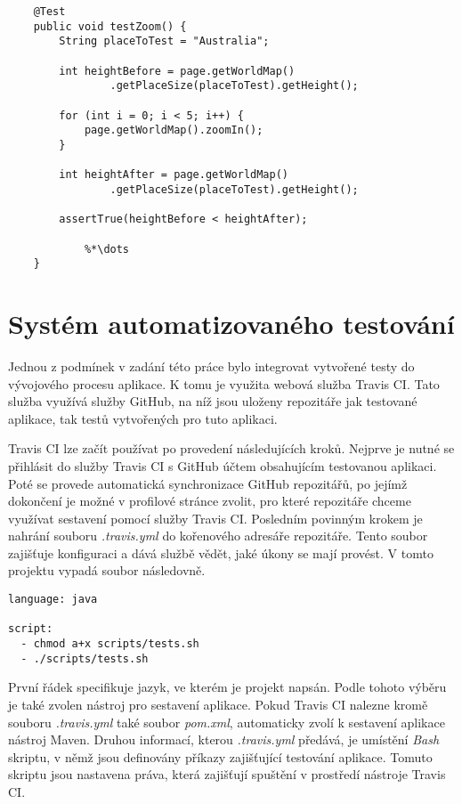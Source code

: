 \documentclass[
    color,   %
	table,   %
    twoside, %
    nolot, nolof
]{fithesis3}
\begin{document}
\begin{lstlisting}
	@Test
	public void testZoom() {
		String placeToTest = "Australia";
		
		int heightBefore = page.getWorldMap()
				.getPlaceSize(placeToTest).getHeight();
				
		for (int i = 0; i < 5; i++) {
			page.getWorldMap().zoomIn();
		}
		
		int heightAfter = page.getWorldMap()
				.getPlaceSize(placeToTest).getHeight();
				
		assertTrue(heightBefore < heightAfter);
		
		 	%*\dots
	}
\end{lstlisting} 

\chapter{Systém automatizovaného testování}
\label{ch:chapter6}
Jednou z podmínek v zadání této práce bylo integrovat vytvořené testy do vývojového procesu aplikace. K tomu je využita webová služba Travis CI. Tato služba využívá služby GitHub, na níž jsou uloženy repozitáře jak testované aplikace, tak testů vytvořených pro tuto aplikaci. 

Travis CI lze začít používat po provedení následujících kroků. Nejprve je nutné se přihlásit do služby Travis CI s GitHub účtem obsahujícím testovanou aplikaci. Poté se provede automatická synchronizace GitHub repozitářů, po jejímž dokončení je možné v profilové stránce zvolit, pro které repozitáře chceme využívat sestavení pomocí služby Travis CI. Posledním povinným krokem je nahrání souboru \emph{.travis.yml} do kořenového adresáře repozitáře. Tento soubor zajišťuje konfiguraci a dává službě vědět, jaké úkony se mají provést. V tomto projektu vypadá soubor následovně.

\begin{lstlisting}
language: java

script:
  - chmod a+x scripts/tests.sh
  - ./scripts/tests.sh
\end{lstlisting} 

První řádek specifikuje jazyk, ve kterém je projekt napsán. Podle tohoto výběru je také zvolen nástroj pro sestavení aplikace. Pokud Travis CI nalezne kromě souboru \emph{.travis.yml} také soubor \emph{pom.xml}, automaticky zvolí k sestavení aplikace nástroj Maven. Druhou informací, kterou \emph{.travis.yml} předává, je umístění \emph{Bash} skriptu, v němž jsou definovány příkazy zajišťující testování aplikace. Tomuto skriptu jsou nastavena práva, která zajišťují spuštění v prostředí nástroje Travis CI.
\end{document}
